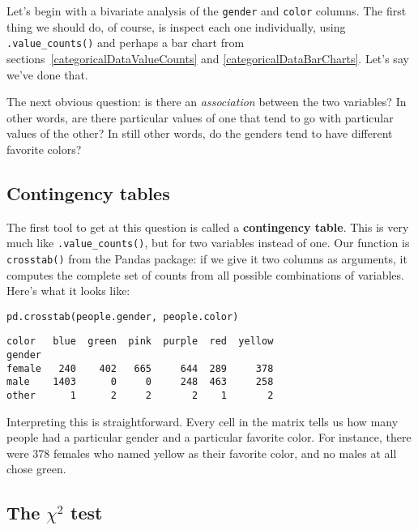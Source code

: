 
Let's begin with a bivariate analysis of the \texttt{gender} and \texttt{color}
columns. The first thing we should do, of course, is inspect each one
individually, using \texttt{.value\_counts()} and perhaps a bar chart from
sections~\ref{categoricalDataValueCounts} and \ref{categoricalDataBarCharts}.
Let's say we've done that.


The next obvious question: is there an \textit{association} between the two
variables? In other words, are there particular values of one that tend to go
with particular values of the other? In still other words, do the genders tend
to have different favorite colors?


\subsection{Contingency tables}

The first tool to get at this question is called a \textbf{contingency table}.
This is very much like \texttt{.value\_counts()}, but for two variables instead
of one. Our function is \texttt{crosstab()} from the Pandas package: if we give
it two columns as arguments, it computes the complete set of counts from all
possible combinations of variables. Here's what it looks like:

\begin{Verbatim}[fontsize=\small,samepage=true,frame=single,framesep=3mm]
pd.crosstab(people.gender, people.color)
\end{Verbatim}
\vspace{-.2in}

\begin{Verbatim}[fontsize=\small,samepage=true,frame=leftline,framesep=5mm,framerule=1mm]
color   blue  green  pink  purple  red  yellow
gender                                        
female   240    402   665     644  289     378
male    1403      0     0     248  463     258
other      1      2     2       2    1       2
\end{Verbatim}

Interpreting this is straightforward. Every cell in the matrix tells us how
many people had a particular gender and a particular favorite color. For
instance, there were 378 females who named yellow as their favorite color, and
no males at all chose green.


\subsection{The $\chi^2$ test}

